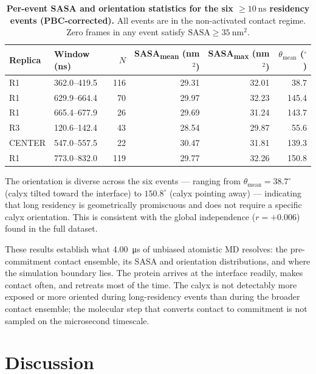 \documentclass[11pt,a4paper]{article}
\begin{document}
\begin{table}[ht]
  \centering
  \caption{\textbf{Per-event SASA and orientation statistics for the
    six $\geq\!\SI{10}{\nano\second}$ residency events (PBC-corrected).}
    All events are in the non-activated contact regime. Zero frames in
    any event satisfy $\mathrm{SASA} \geq \SI{35}{\nano\metre\squared}$.}
  \label{tab:long-events}
  \begin{tabular}{llrrrr}
    \toprule
    Replica & Window (ns) & $N$ & SASA\textsubscript{mean} (nm$^2$) & SASA\textsubscript{max} (nm$^2$) & $\theta_\mathrm{mean}$ ($^\circ$) \\
    \midrule
    R1      & 362.0--419.5   & 116 & 29.31 & 32.01 &  38.7 \\
    R1      & 629.9--664.4   &  70 & 29.97 & 32.23 & 145.4 \\
    R1      & 665.4--677.9   &  26 & 29.69 & 31.24 & 143.7 \\
    R3      & 120.6--142.4   &  43 & 28.54 & 29.87 &  55.6 \\
    CENTER  & 547.0--557.5   &  22 & 30.47 & 31.81 & 139.3 \\
    R1      & 773.0--832.0   & 119 & 29.77 & 32.26 & 150.8 \\
    \bottomrule
  \end{tabular}
\end{table}

The orientation is diverse across the six events --- ranging from
$\theta_\mathrm{mean} = 38.7^\circ$ (calyx tilted toward the interface)
to $150.8^\circ$ (calyx pointing away) --- indicating that long residency
is geometrically promiscuous and does not require a specific calyx
orientation. This is consistent with the global independence ($r = +0.006$)
found in the full dataset.

These results establish what \SI{4.00}{\micro\second} of unbiased atomistic
MD resolves: the pre-commitment contact ensemble, its SASA and
orientation distributions, and where the simulation boundary lies. The
protein arrives at the interface readily, makes contact often, and
retreats most of the time. The calyx is not detectably more exposed or
more oriented during long-residency events than during the broader
contact ensemble; the molecular step that converts contact to commitment
is not sampled on the microsecond timescale.

\section{Discussion}
\end{document}
